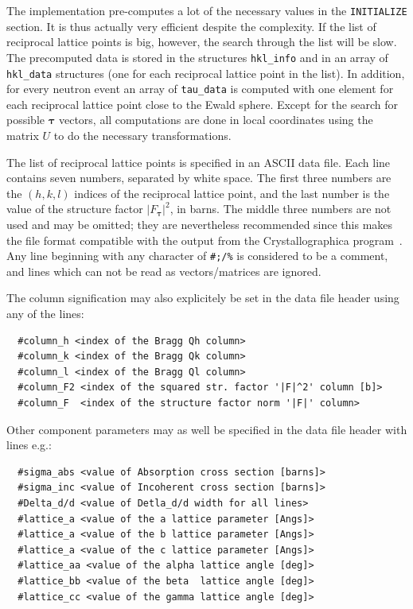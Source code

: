 The implementation pre-computes a lot of the necessary values in the
\texttt{INITIALIZE} section. It is thus actually very efficient despite
the complexity. If the list of reciprocal lattice points is big,
however, the search through the list will be slow. The precomputed data
is stored in the structures \texttt{hkl\_info} and in an array of
\texttt{hkl\_data} structures (one for each reciprocal lattice point in
the list). In addition, for every neutron event an array of
\texttt{tau\_data} is computed with one element for each reciprocal
lattice point close to the Ewald sphere. Except for the search for
possible $\boldsymbol{\tau}$ vectors, all computations are done in local
coordinates using the matrix $U$ to do the necessary transformations.

The list of reciprocal lattice points is specified in an ASCII data
file. Each line contains seven numbers, separated by white space. The
first three numbers are the $(h,k,l)$ indices of the reciprocal lattice
point, and the last number is the value of the structure factor
$|F_{\boldsymbol{\tau}}|^2$, in barns. The middle three numbers are not
used and may be omitted; they are nevertheless recommended since this makes
the file format compatible with the output from the Crystallographica
program~\cite{crystallographica}.
Any line beginning with any character of \verb+#;/%+ is considered to be a
comment, and lines which can not be read as vectors/matrices are ignored.

The column signification may also explicitely be set in the data file header using any of the lines:
\begin{lstlisting}
  #column_h <index of the Bragg Qh column>
  #column_k <index of the Bragg Qk column>
  #column_l <index of the Bragg Ql column>
  #column_F2 <index of the squared str. factor '|F|^2' column [b]>
  #column_F  <index of the structure factor norm '|F|' column>
\end{lstlisting}

Other component parameters may as well be specified in the data file
header with lines e.g.:
\begin{lstlisting}
  #sigma_abs <value of Absorption cross section [barns]>
  #sigma_inc <value of Incoherent cross section [barns]>
  #Delta_d/d <value of Detla_d/d width for all lines>
  #lattice_a <value of the a lattice parameter [Angs]>
  #lattice_a <value of the b lattice parameter [Angs]>
  #lattice_a <value of the c lattice parameter [Angs]>
  #lattice_aa <value of the alpha lattice angle [deg]>
  #lattice_bb <value of the beta  lattice angle [deg]>
  #lattice_cc <value of the gamma lattice angle [deg]>
\end{lstlisting}

